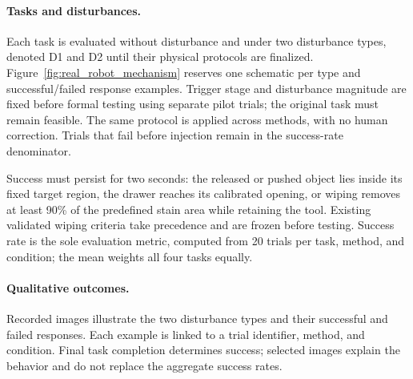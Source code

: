 \documentclass[letterpaper, 10 pt, conference]{ieeeconf}
\begin{document}
\paragraph{Tasks and disturbances.}
Each task is evaluated without disturbance and under two disturbance types, denoted D1 and D2 until their physical protocols are finalized. Figure~\ref{fig:real_robot_mechanism} reserves one schematic per type and successful/failed response examples. Trigger stage and disturbance magnitude are fixed before formal testing using separate pilot trials; the original task must remain feasible. The same protocol is applied across methods, with no human correction. Trials that fail before injection remain in the success-rate denominator.

Success must persist for two seconds: the released or pushed object lies inside its fixed target region, the drawer reaches its calibrated opening, or wiping removes at least 90\% of the predefined stain area while retaining the tool. Existing validated wiping criteria take precedence and are frozen before testing. Success rate is the sole evaluation metric, computed from 20 trials per task, method, and condition; the mean weights all four tasks equally.

\paragraph{Qualitative outcomes.}
Recorded images illustrate the two disturbance types and their successful and failed responses. Each example is linked to a trial identifier, method, and condition. Final task completion determines success; selected images explain the behavior and do not replace the aggregate success rates.
\end{document}
